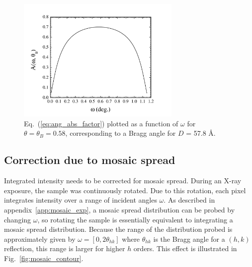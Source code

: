 \begin{figure}[htbp]
  \centering
  \includegraphics[width=0.7\textwidth]{figures/ripple/analysis/abs_integrand}
  \caption[Eq.~(\ref{eq:ang_abs_factor}) plotted as a function of $\omega$ for 
  $\theta=\theta_B$]{Eq.~(\ref{eq:ang_abs_factor}) plotted as a function of 
  $\omega$ for $\theta=\theta_B=0.58$\textdegree, corresponding to a Bragg
  angle for $D$ = 57.8 \AA.}
  \label{fig:abs_integrand}
\end{figure}

\subsection{Correction due to mosaic spread}\label{sec:mosaic_spread_correction}
Integrated intensity needs to be corrected for mosaic spread. 
During an X-ray exposure, the sample
was continuously rotated. Due to this rotation, each pixel integrates 
intensity over a range of incident angles $\omega$.
As described in appendix~\ref{app:mosaic_exp}, 
a mosaic spread distribution can be probed
by changing $\omega$, so rotating the sample is essentially  
equivalent to integrating a mosaic spread distribution.
Because the range of the distribution probed is approximately given by $\omega=[0, 2\theta_{hk}]$ 
where $\theta_{hk}$ is the Bragg angle for a $(h,k)$ reflection, 
this range is larger for higher $h$ orders. 
This effect is illustrated in Fig.~\ref{fig:mosaic_contour}.


